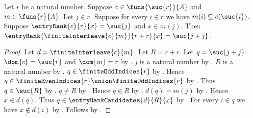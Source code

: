 \begin{proposition}\label{entry_rank_interleave_inserted}
    Let $r$ be a natural number.
    Suppose $c\in\funs{\suc{r}}{A}$ and $m\in\funs{r}{A}$.
    Let $j\in r$.
    Suppose for every $i\in r$ we have
        $m(i)\subseteq c(\suc{i})$.
    Suppose $\entryRank{c}{r}{x}=\suc{j}$ and $x\in m(j)$.
    Then
        $\entryRank{\finiteInterleave{c}{m}}{r+r}{x}
            =\suc{j+j}$.
\end{proposition}
\begin{proof}
    Let $d=\finiteInterleave{c}{m}$.
    Let $R=r+r$.
    Let $q=\suc{j+j}$.
    $\dom{c}=\suc{r}$ and $\dom{m}=r$ by .
    $j$ is a natural number
        by .
    $R$ is a natural number by .
    $q\in\finiteOddIndices{r}$
        by .
    Hence $q\in\finiteEvenIndices{r}\union\finiteOddIndices{r}$
        by .
    Thus $q\in\suc{R}$
        by .
    $q\neq R$ by .
    Hence $q\in R$ by .
    $d(q)=m(j)$ by .
    Hence $x\in d(q)$.
    Thus $q\in\entryRankCandidates{d}{R}{x}$
        by .
    For every $i\in q$ we have $x\notin d(i)$
        by .
    Follows by .
\end{proof}

